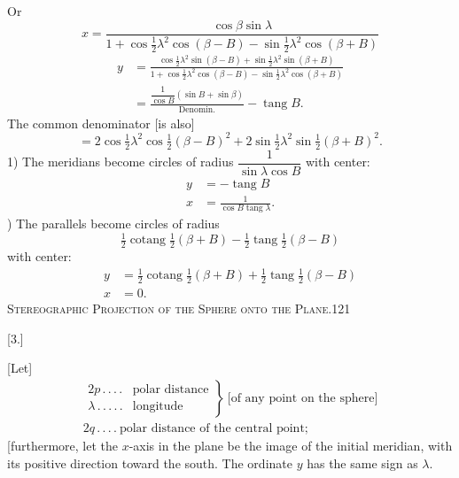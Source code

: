 Or
\[
x=\frac{\cos\beta\sin\lambda}{1+\cos\frac12\lambda^2\cos(\beta-B)-\sin\frac12\lambda^2\cos(\beta+B)}
\]
\[
\begin{aligned}
y&=\frac{\cos\frac12\lambda^2\sin(\beta-B)+\sin\frac12\lambda^2\sin(\beta+B)}{1+\cos\frac12\lambda^2\cos(\beta-B)-\sin\frac12\lambda^2\cos(\beta+B)}\\[6pt]
&=\frac{\dfrac1{\cos B}(\sin B+\sin\beta)}{\mathrm{Denomin.}}-\operatorname{tang}B.
\end{aligned}
\]
The common denominator [is also]
\[
=2\cos\tfrac12\lambda^2\cos\tfrac12(\beta-B)^2+2\sin\tfrac12\lambda^2\sin\tfrac12(\beta+B)^2.
\]
1) The meridians become circles of radius $\dfrac1{\sin\lambda\cos B}$ with center:
\[
\begin{aligned}
y&=-\operatorname{tang}B\\
x&=\frac1{\cos B\operatorname{tang}\lambda}.
\end{aligned}
\]
) The parallels become circles of radius
\[
\tfrac12\operatorname{cotang}\tfrac12(\beta+B)-\tfrac12\operatorname{tang}\tfrac12(\beta-B)
\]
with center:
\[
\begin{aligned}
y&=\tfrac12\operatorname{cotang}\tfrac12(\beta+B)+\tfrac12\operatorname{tang}\tfrac12(\beta-B)\\
x&=0.
\end{aligned}
\]
\clearpage
\noindent\mbox{}\hfill{\small\textsc{Stereographic Projection of the Sphere onto the Plane.}}\hfill121\par\bigskip
\begin{center}[3.]\end{center}
[Let]
\[
\begin{gathered}
\left.\begin{array}{ll}
2p\, .\, .\, .\, .&\text{polar distance}\\
\lambda\, .\, .\, .\, .\, .&\text{longitude}
\end{array}\right\}\ \text{[of any point on the sphere]}\\[5pt]
2q\, .\, .\, .\, .\ \text{polar distance of the central point;}
\end{gathered}
\]
[furthermore, let the $x$-axis in the plane be the image of the initial meridian, with its positive direction toward the south. The ordinate $y$ has the same sign as $\lambda$.

